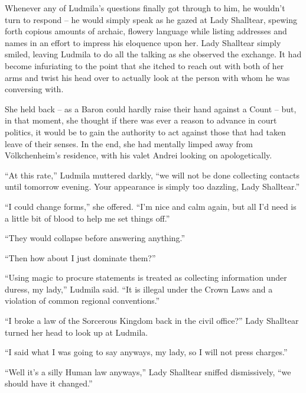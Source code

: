  

Whenever any of Ludmila’s questions finally got through to him, he wouldn’t turn to respond – he would simply speak as he gazed at Lady Shalltear, spewing forth copious amounts of archaic, flowery language while listing addresses and names in an effort to impress his eloquence upon her. Lady Shalltear simply smiled, leaving Ludmila to do all the talking as she observed the exchange. It had become infuriating to the point that she itched to reach out with both of her arms and twist his head over to actually look at the person with whom he was conversing with.

 

She held back – as a Baron could hardly raise their hand against a Count – but, in that moment, she thought if there was ever a reason to advance in court politics, it would be to gain the authority to act against those that had taken leave of their senses. In the end, she had mentally limped away from Völkchenheim’s residence, with his valet Andrei looking on apologetically.

 

“At this rate,” Ludmila muttered darkly, “we will not be done collecting contacts until tomorrow evening. Your appearance is simply too dazzling, Lady Shalltear.”

 

“I could change forms,” she offered. “I’m nice and calm again, but all I’d need is a little bit of blood to help me set things off.”

 

“They would collapse before answering anything.”

 

“Then how about I just dominate them?”

 

“Using magic to procure statements is treated as collecting information under duress, my lady,” Ludmila said. “It is illegal under the Crown Laws and a violation of common regional conventions.”

 

“I broke a law of the Sorcerous Kingdom back in the civil office?” Lady Shalltear turned her head to look up at Ludmila.

 

“I said what I was going to say anyways, my lady, so I will not press charges.”

 

“Well it’s a silly Human law anyways,” Lady Shalltear sniffed dismissively, “we should have it changed.”

